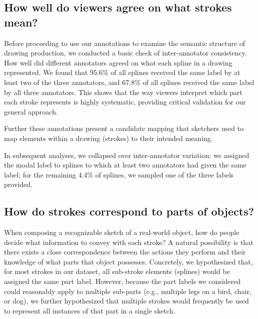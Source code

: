 \documentclass[10pt,letterpaper]{article}
\newcommand{\kushin}[1]{{\color{orange}{[kushin: #1]}}}
\begin{document}
\subsection{How well do viewers agree on what strokes mean?}

Before proceeding to use our annotations to examine the semantic structure of drawing production, we conducted a basic check of inter-annotator consistency.
How well did different annotators agreed on what each spline in a drawing represented. 
We found that 95.6\% of all splines received the same label by at least two of the three annotators, and 67.8\% of all splines received the same label by all three annotators. 
This shows that the way viewers interpret which part each stroke represents is highly systematic, providing critical validation for our general approach. 

Further these annotations present a candidate mapping that sketchers used to map elements within a drawing (strokes) to their intended meaning. 

In subsequent analyses, we collapsed over inter-annotator variation: we assigned the modal label to splines to which at least two annotators had given the same label; for the remaining 4.4\% of splines, we sampled one of the three labels provided.


\subsection{How do strokes correspond to parts of objects?}

When composing a recognizable sketch of a real-world object, how do people decide what information to convey with each stroke? 
A natural possibility is that there exists a close correspondence between the actions they perform and their knowledge of what parts that object possesses. %
Concretely, we hypothesized that, for most strokes in our dataset, all sub-stroke elements (splines) would be assigned the same part label. 
However, because the part labels we considered could reasonably apply to multiple sub-parts (e.g., multiple legs on a bird, chair, or dog), we further hypothesized that multiple strokes would frequently be used to represent all instances of that part in a single sketch.
\end{document}
